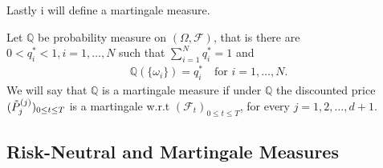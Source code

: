 \documentclass{beamer}
\numberwithin{equation}{section}
\begin{document}
\begin{frame}\frametitle{{\normalsize \secname} \\ {\large \subsecname}}
    Lastly i will define a martingale measure.
    \begin{definition}
        Let $\mathbb{Q}$ be probability measure on $(\Omega, \mathscr{F})$, that is there are $0 < q^*_i < 1, i = 1, \ldots, N$ such that $\sum_{i=1}^N q^*_i = 1$ and 
        \begin{align}
            \mathbb{Q}(\{ \omega_i \}) = q^*_i \quad \text{for } i = 1, \ldots, N. 
        \end{align}
        We will say that $\mathbb{Q}$ is a martingale measure if under $\mathbb{Q}$ the discounted price $(\Tilde{P}_j^{(j)})_{0 \leq t \leq T}$ is a martingale w.r.t $(\mathscr{F}_t)_{0 \leq t \leq T}$, for every $j = 1,2, \ldots, d+1$.
    \end{definition}
\end{frame}

\subsection{Risk-Neutral and Martingale Measures}
\end{document}
